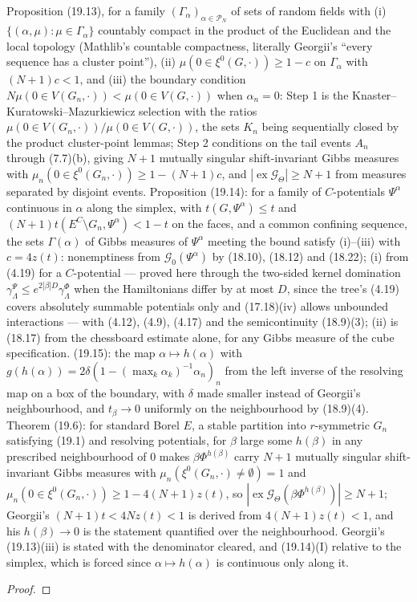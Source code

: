 \begin{theorem}
    Proposition (19.13), for a family $(\Gamma_\alpha)_{\alpha \in \mathcal P_N}$ of sets of random
    fields with (i) $\{(\alpha,\mu) : \mu \in \Gamma_\alpha\}$ countably compact in the product of the
    Euclidean and the local topology (Mathlib's countable compactness, literally Georgii's ``every
    sequence has a cluster point''), (ii) $\mu(0 \in \xi^0(G,\cdot)) \geq 1 - c$ on $\Gamma_\alpha$
    with $(N+1)c < 1$, and (iii) the boundary condition $N\mu(0 \in V(G_n,\cdot)) < \mu(0 \in V(G,\cdot))$
    when $\alpha_n = 0$: Step 1 is the Knaster--Kuratowski--Mazurkiewicz selection with the ratios
    $\mu(0 \in V(G_n,\cdot))/\mu(0 \in V(G,\cdot))$, the sets $K_n$ being sequentially closed by the
    product cluster-point lemmas; Step 2 conditions on the tail events $A_n$ through (7.7)(b),
    giving $N+1$ mutually singular shift-invariant Gibbs measures with
    $\mu_n(0 \in \xi^0(G_n,\cdot)) \geq 1 - (N+1)c$, and $|\operatorname{ex}\mathcal G_\Theta| \geq
    N+1$ from measures separated by disjoint events. Proposition (19.14): for a family of
    $C$-potentials $\Psi^\alpha$ continuous in $\alpha$ along the simplex, with $t(G,\Psi^\alpha)
    \leq t$ and $(N+1)t(E^C\setminus G_n,\Psi^\alpha) < 1 - t$ on the faces, and a common confining
    sequence, the sets $\Gamma(\alpha)$ of Gibbs measures of $\Psi^\alpha$ meeting the bound satisfy
    (i)--(iii) with $c = 4z(t)$: nonemptiness from $\mathcal G_0(\Psi^\alpha)$ by (18.10), (18.12) and
    (18.22); (i) from (4.19) for a $C$-potential --- proved here through the two-sided kernel
    domination $\gamma^\Psi_\Lambda \leq e^{2|\beta|D}\gamma^\Phi_\Lambda$ when the Hamiltonians differ by
    at most $D$, since the tree's (4.19) covers absolutely summable potentials only and (17.18)(iv)
    allows unbounded interactions --- with (4.12), (4.9), (4.17) and the semicontinuity (18.9)(3);
    (ii) is (18.17) from the chessboard estimate alone, for any Gibbs measure of the cube
    specification. (19.15): the map $\alpha \mapsto h(\alpha)$ with $g(h(\alpha)) = 2\delta(1 -
    (\max_k\alpha_k)^{-1}\alpha_n)_n$ from the left inverse of the resolving map on a box of the
    boundary, with $\delta$ made smaller instead of Georgii's neighbourhood, and $t_\beta \to 0$
    uniformly on the neighbourhood by (18.9)(4). Theorem (19.6): for standard Borel $E$, a stable
    partition into $r$-symmetric $G_n$ satisfying (19.1) and resolving potentials, for $\beta$ large
    some $h(\beta)$ in any prescribed neighbourhood of $0$ makes $\beta\Phi^{h(\beta)}$ carry $N+1$
    mutually singular shift-invariant Gibbs measures with $\mu_n(\xi^0(G_n,\cdot) \neq \emptyset)
    = 1$ and $\mu_n(0 \in \xi^0(G_n,\cdot)) \geq 1 - 4(N+1)z(t)$, so
    $|\operatorname{ex}\mathcal G_\Theta(\beta\Phi^{h(\beta)})| \geq N+1$; Georgii's
    $(N+1)t < 4Nz(t) < 1$ is derived from $4(N+1)z(t) < 1$, and his $h(\beta) \to 0$ is the statement
    quantified over the neighbourhood. Georgii's (19.13)(iii) is stated with the denominator
    cleared, and (19.14)(I) relative to the simplex, which is forced since $\alpha \mapsto h(\alpha)$
    is continuous only along it.
\end{theorem}
\begin{proof}
    \leanok
\end{proof}
